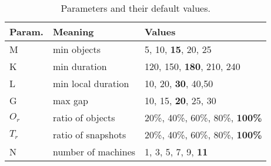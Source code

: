 \begin{table}[h]
\centering
\caption{Parameters and their default values.}
\label{tbl:parameters}
\begin{tabular}{|l|l|l|}
\hline 
\textbf{Param.} & \textbf{Meaning} & \textbf{Values} \\ 
\hline 
M & min  objects &  5, 10,  \textbf{15}, 20, 25 \\ 
\hline 
K & min duration & 120, 150, \textbf{180}, 210, 240 \\ 
\hline 
L & min local duration & 10, 20, \textbf{30}, 40,50 \\ 
\hline 
G & max gap & 10, 15, \textbf{20}, 25, 30 \\ 
\hline
$O_r$ & ratio of objects & 20\%, 40\%, 60\%, 80\%, \textbf{100\%} \\ \hline
$T_r$ & ratio of snapshots & 20\%, 40\%, 60\%, 80\%, \textbf{100\%} \\ \hline
N & number of machines & 1, 3, 5, 7, 9, \textbf{11}\\ 
\hline 
\end{tabular} 
\end{table}

